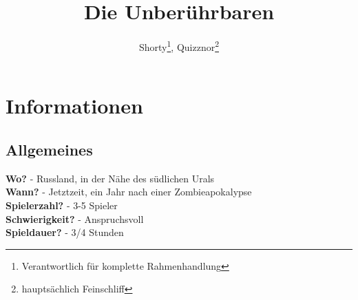 \documentclass{include/protokollclass}
\title{Die Unberührbaren}
\author{Shorty\thanks{Verantwortlich für komplette Rahmenhandlung}, Quizznor\thanks{hauptsächlich Feinschliff}}
\begin{document}
\maketitle
\tableofcontents

\chapter{Informationen}

\section{Allgemeines}
\textbf{Wo?}            - Russland, in der Nähe des südlichen Urals \\
\textbf{Wann?}          - Jetztzeit, ein Jahr nach einer Zombieapokalypse \\
\textbf{Spielerzahl?}   - 3-5 Spieler \\
\textbf{Schwierigkeit?} - Anspruchsvoll \\
\textbf{Spieldauer?}    - 3/4 Stunden
\end{document}
